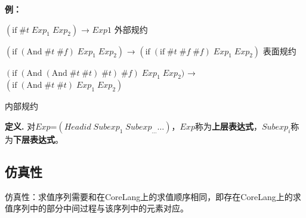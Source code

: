 {\bfseries 例：}

$(\mbox{if}\; \#t\; Exp_{1}\; Exp_{2})$ → $Exp1$ \hfill 外部规约

$(\mbox{if}\; (\mbox{And}\; \#t\; \#f)\; Exp_{1}\; Exp_{2})$ → $(\mbox{if}\; (\mbox{if}\; \#t\; \#f\; \#f)\; Exp_{1}\; Exp_{2})$ \hfill 表面规约

$(\mbox{if}\; (\mbox{And}\; (\mbox{And}\; \#t\; \#t)\; \#t)\; \#f)\; Exp_{1}\; Exp_{2})$ → $(\mbox{if}\; (\mbox{And}\; \#t\; \#t)\; Exp_{1}\; Exp_{2})$ 

\hfill 内部规约

{\bfseries 定义.} 对$Exp$=$(Headid\;Subexp_{1}\;Subexp_{\ldots} \ldots)$，$Exp$称为{\bfseries 上层表达式}，$Subexp_{i}$称为{\bfseries 下层表达式}。

\subsection{仿真性}
仿真性：求值序列需要和在CoreLang上的求值顺序相同，即存在CoreLang上的求值序列中的部分中间过程与该序列中的元素对应。

